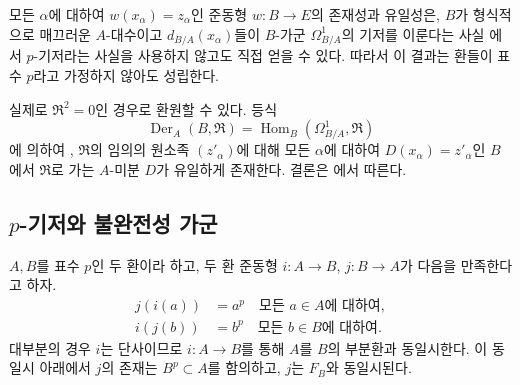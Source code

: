 \begin{remark}[21.2.8]
\label{0.21.2.8-ko}
모든 $\alpha$에 대하여 $w(x_\alpha)=z_\alpha$인 준동형
$w:B\to E$의 존재성과 유일성은, $B$가 형식적으로 매끄러운
$A$-대수이고 $d_{B/A}(x_\alpha)$들이 $B$-가군
$\Omega^1_{B/A}$의 기저를 이룬다는 사실 에서
$p$-기저라는 사실을 사용하지 않고도 직접 얻을 수 있다. 따라서 이
결과는 환들이 표수 $p$라고 가정하지 않아도 성립한다.

실제로 $\mathfrak R^2=0$인 경우로 환원할 수 있다. 등식
\[
  \operatorname{Der}_A(B,\mathfrak R)
  =\operatorname{Hom}_B(\Omega^1_{B/A},\mathfrak R)
\]
에 의하여 , $\mathfrak R$의 임의의 원소족
$(z'_\alpha)$에 대해 모든 $\alpha$에 대하여
$D(x_\alpha)=z'_\alpha$인 $B$에서 $\mathfrak R$로 가는
$A$-미분 $D$가 유일하게 존재한다. 결론은 에서
따른다.
\end{remark}

\subsection{$p$-기저와 불완전성 가군}
\label{subsection:0.21.3-ko}

\begin{env}[21.3.1]
\label{0.21.3.1-ko}
$A,B$를 표수 $p$인 두 환이라 하고, 두 환 준동형
$i:A\to B$, $j:B\to A$가 다음을 만족한다고 하자.
\begin{align}
\tag{21.3.1.1}\label{0.21.3.1.1-ko}
j(i(a))&=a^p\quad\text{모든 }a\in A\text{에 대하여},\\
\tag{21.3.1.2}\label{0.21.3.1.2-ko}
i(j(b))&=b^p\quad\text{모든 }b\in B\text{에 대하여}.
\end{align}
대부분의 경우 $i$는 단사이므로 $i:A\to B$를 통해 $A$를 $B$의
부분환과 동일시한다. 이 동일시 아래에서 $j$의 존재는
$B^p\subset A$를 함의하고, $j$는 $F_B$와 동일시된다.
\end{env}

